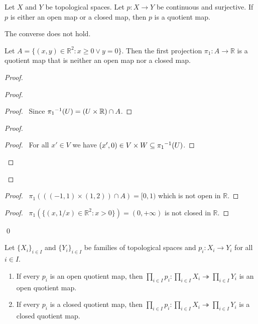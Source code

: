 \begin{cor}
Let $X$ and $Y$ be topological spaces. Let $p : X \rightarrow Y$ be continuous and surjective. If $p$ is either an open map or a closed map, then $p$ is a quotient map.
\end{cor}

\begin{ex}
The converse does not hold.

Let $A = \{ (x,y) \in \mathbb{R}^2 : x \geq 0 \vee y = 0 \}$. Then the first projection $\pi_1 : A \rightarrow \mathbb{R}$ is a quotient map that is neither an open map nor a closed map.
\end{ex}

\begin{proof}
\pf
{}
\begin{proof}
	\begin{proof}
		\pf\ Since ${\pi_1}^{-1}(U) = (U \times \mathbb{R}) \cap A$.
	\end{proof}
	\begin{proof}
		\begin{proof}
			\pf\ For all $x' \in V$ we have $(x',0) \in V \times W \subseteq {\pi_1}^{-1}(U)$.
		\end{proof}
	\end{proof}
\end{proof}
\begin{proof}
	\pf\ $\pi_1(((-1,1) \times (1,2)) \cap A) = [0,1)$ which is not open in $\mathbb{R}$.
\end{proof}
\begin{proof}
	\pf\ $\pi_1(\{(x,1/x) \in \mathbb{R}^2 : x > 0 \}) = (0, + \infty)$ is not closed in $\mathbb{R}$.
\end{proof}
\qed
\end{proof}

\begin{cor}
\label{cor:product_quotient_maps}
Let $\{ X_i \}_{i \in I}$ and $\{ Y_i \}_{i \in I}$ be families of topological spaces and $p_i : X_i \rightarrow Y_i$ for all $i \in I$.
\begin{enumerate}
\item If every $p_i$ is an open quotient map, then $\prod_{i \in I} p_i : \prod_{i \in I} X_i \twoheadrightarrow \prod_{i \in I} Y_i$ is an open quotient map.
\item If every $p_i$ is a closed quotient map, then $\prod_{i \in I} p_i : \prod_{i \in I} X_i \twoheadrightarrow \prod_{i \in I} Y_i$ is a closed quotient map.
\end{enumerate}
\end{cor}

